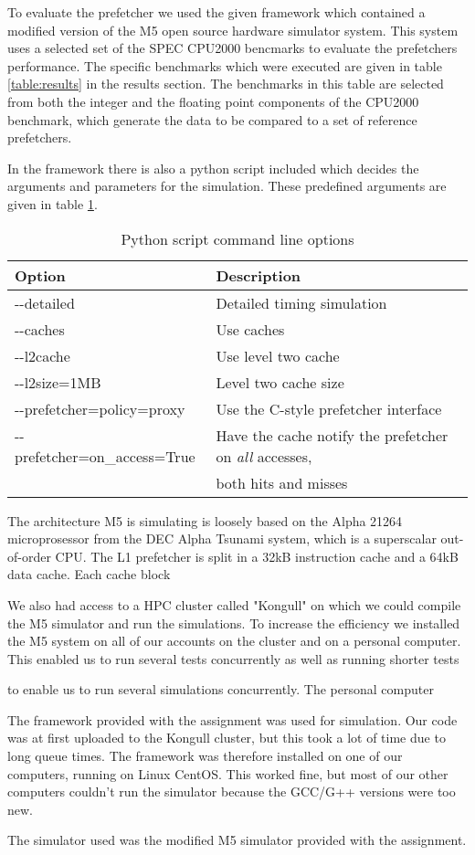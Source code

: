 To evaluate the prefetcher we used the given framework which contained a modified version of the M5 open source hardware simulator system. This system uses a selected set of the SPEC CPU2000 bencmarks to evaluate the prefetchers performance. The specific benchmarks which were executed are given in table \ref{table:results} in the results section. The benchmarks in this table are selected from both the integer and the floating point components of the CPU2000 benchmark, which generate the data to be compared to a set of reference prefetchers. 

In the framework there is also a python script included which decides the arguments and parameters for the simulation. These predefined arguments are given in table \ref{table:cmdlineopt}.

\begin{table}[!t]
\renewcommand{\arraystretch}{1.3}
\caption{Python script command line options}
\label{table:cmdlineopt}
\centering
\begin{tabular}{l l}
\bfseries Option & \bfseries Description\\
\hline
-\--detailed & Detailed timing simulation\\
-\--caches & Use caches\\
-\--l2cache & Use level two cache\\
-\--l2size=1MB & Level two cache size\\
-\--prefetcher=policy=proxy & Use the C-style prefetcher interface\\
-\--prefetcher=on\_access=True & Have the cache notify the prefetcher on \emph{all} accesses,\\& both hits and misses\\
\hline
\end{tabular}
\end{table}

The architecture M5 is simulating is loosely based on the Alpha 21264 microprosessor from the DEC Alpha Tsunami system, which is a superscalar out-of-order CPU. The L1 prefetcher is split in a 32kB instruction cache and a 64kB data cache. Each cache block 


We also had access to a HPC cluster called "Kongull" on which we could compile the M5 simulator and run the simulations. To increase the efficiency we installed the M5 system on all of our accounts on the cluster and on a personal computer. This enabled us to run several tests concurrently as well as running shorter tests 

to enable us to run several simulations concurrently. The personal computer 

The framework provided with the assignment was used for simulation. Our code was at first uploaded to the Kongull cluster, but this took a lot of time due to long queue times. The framework was therefore installed on one of our computers, running on Linux CentOS. This worked fine, but most of our other computers couldn't run the simulator because the GCC/G++ versions were too new. 

The simulator used was the modified M5 simulator provided with the assignment. 

